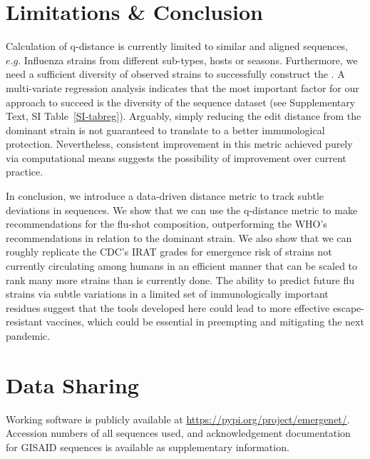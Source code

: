 \documentclass[onecolumn, compsoc,10pt]{IEEEtran}
\begin{document}
\section*{Limitations \& Conclusion}

Calculation of q-distance  is currently limited to similar and aligned sequences, $e.g.$  Influenza strains from different sub-types, hosts or seasons. Furthermore, we need a sufficient diversity of observed strains to successfully construct the \qnet. A multi-variate regression analysis indicates  that the most important factor for our approach to succeed is  the diversity of the sequence dataset (see Supplementary Text, SI Table~\ref{SI-tabreg}). Arguably, simply reducing the edit distance from the dominant strain is not guaranteed to translate to a better immunological protection. Nevertheless, consistent improvement in this metric achieved purely via computational means suggests the possibility of improvement over current practice. 

In conclusion, we introduce a data-driven distance metric to track subtle deviations in sequences. We show that we can use the q-distance metric to make recommendations for the flu-shot composition, outperforming the WHO's recommendations in relation to the dominant strain. We also show that we can roughly replicate the CDC's IRAT grades for emergence risk of strains not currently circulating among humans in an efficient manner that can be scaled to rank many more strains than is currently done. The ability to predict future flu strains via subtle variations in a limited set of immunologically important residues suggest that the tools developed here could lead to more effective escape-resistant vaccines, which could be essential in preempting and mitigating the next pandemic.











\section*{Data Sharing} 

Working software is publicly available at \href{https://pypi.org/project/quasinet/}{https://pypi.org/project/emergenet/}.
Accession numbers of all sequences used, and acknowledgement documentation for GISAID sequences is available as supplementary information.
\end{document}
